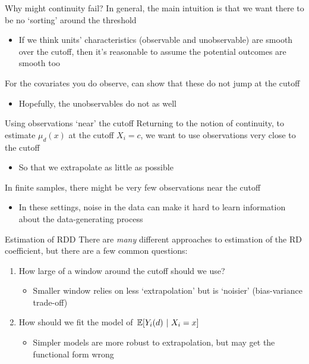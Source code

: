 \documentclass[aspectratio=169,t,11pt,table]{beamer}
\begin{document}
\begin{frame}{Why might continuity fail?}{}
  In general, the main intuition is that we want there to be no `sorting' around the threshold
  \begin{itemize}
    \item If we think units' characteristics (observable and unobservable) are smooth over the cutoff, then it's reasonable to assume the potential outcomes are smooth too
  \end{itemize}

  \pause
  \bigskip
  For the covariates you do observe, can show that these do not jump at the cutoff
  \begin{itemize}
    \item Hopefully, the unobservables do not as well
  \end{itemize}
\end{frame}

\begin{frame}{Using observations `near' the cutoff}{}
  Returning to the notion of continuity, to estimate $\mu_d(x)$ at the cutoff $X_i = c$, we want to use observations very close to the cutoff
  \begin{itemize}
    \item So that we extrapolate as little as possible
  \end{itemize}

  \bigskip
  In finite samples, there might be very few observations near the cutoff
  \begin{itemize}
    \item In these settings, noise in the data can make it hard to learn information about the data-generating process
  \end{itemize}
\end{frame}

\begin{frame}{Estimation of RDD}
  There are \emph{many} different approaches to estimation of the RD coefficient, but there are a few common questions:
  \begin{enumerate}
    \item How large of a window around the cutoff should we use?
    \begin{itemize}
      \item Smaller window relies on less `extrapolation' but is `noisier' (bias-variance trade-off)
    \end{itemize}
    
    \item How should we fit the model of $\expec{Y_i(d)}{X_i = x}$
    \begin{itemize}
      \item Simpler models are more robust to extrapolation, but may get the functional form wrong
    \end{itemize}
  \end{enumerate}
\end{frame}
\end{document}
